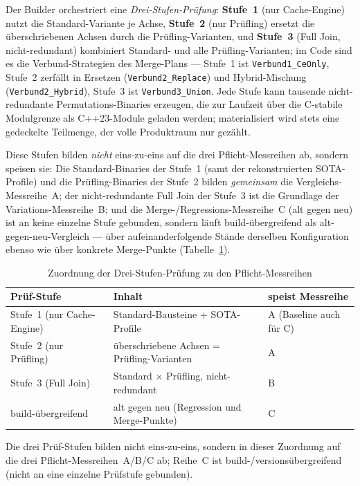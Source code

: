 \begin{nurkurz}
Der Builder orchestriert eine \emph{Drei-Stufen-Prüfung}: \textbf{Stufe~1} (nur Cache-Engine) nutzt die
Standard-Variante je Achse, \textbf{Stufe~2} (nur Prüfling) ersetzt die überschriebenen Achsen durch die
Prüfling-Varianten, und \textbf{Stufe~3} (Full Join, nicht-redundant) kombiniert Standard- und alle
Prüfling-Varianten; im Code sind es die Verbund-Strategien des Merge-Plans --- Stufe~1 ist
\texttt{Verbund1\_CeOnly}, Stufe~2 zerfällt in Ersetzen (\texttt{Verbund2\_Replace}) und Hybrid-Mischung
(\texttt{Verbund2\_Hybrid}), Stufe~3 ist \texttt{Verbund3\_Union}. Jede Stufe kann tausende nicht-redundante
Permutations-Binaries erzeugen, die zur Laufzeit über die C-stabile Modulgrenze als C++23-Module geladen
werden; materialisiert wird stets eine gedeckelte Teilmenge, der volle Produktraum nur gezählt.

Diese Stufen bilden \emph{nicht} eins-zu-eins auf die drei Pflicht-Messreihen ab, sondern speisen sie: Die
Standard-Binaries der Stufe~1 (samt der rekonstruierten SOTA-Profile) und die Prüfling-Binaries der
Stufe~2 bilden \emph{gemeinsam} die Vergleichs-Messreihe~A\@; der nicht-redundante Full Join der Stufe~3 ist
die Grundlage der Variations-Messreihe~B\@; und die Merge-/Regressions-Messreihe~C (alt gegen neu) ist an
keine einzelne Stufe gebunden, sondern läuft build-übergreifend als alt-gegen-neu-Vergleich --- über
aufeinanderfolgende Stände derselben Konfiguration ebenso wie über konkrete Merge-Punkte
(Tabelle~\ref{tab:stage-series}).

\begin{table}[!htbp]
  \centering
  \caption{Zuordnung der Drei-Stufen-Prüfung zu den Pflicht-Messreihen}\label{tab:stage-series}
  \begin{tabular}{@{}lll@{}}
    \toprule
    \textbf{Prüf-Stufe} & \textbf{Inhalt} & \textbf{speist Messreihe} \\
    \midrule
    Stufe~1 (nur Cache-Engine) & Standard-Bausteine + SOTA-Profile & A (Baseline auch für C) \\
    Stufe~2 (nur Prüfling) & überschriebene Achsen = Prüfling-Varianten & A \\
    Stufe~3 (Full Join) & Standard $\times$ Prüfling, nicht-redundant & B \\
    build-übergreifend & alt gegen neu (Regression und Merge-Punkte) & C \\
    \bottomrule
  \end{tabular}

  \smallskip
  {\footnotesize Die drei Prüf-Stufen bilden nicht eins-zu-eins, sondern in dieser Zuordnung auf die
  drei Pflicht-Messreihen~A/B/C ab; Reihe~C ist build-/versionsübergreifend (nicht an eine einzelne
  Prüfstufe gebunden).\par}
\end{table}


\end{nurkurz}
